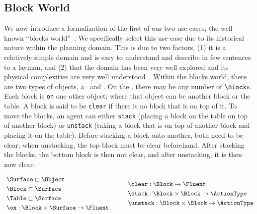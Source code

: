 \subsection{Block World}

We now introduce a formalization of the first of our two use-cases, the
well-known ``blocks world''~\cite{nilsson_principles_1982}. We specifically select
this use-case due to its historical nature within the planning domain.
This is due to two factors, (1) it is a relatively simple domain and is
easy to understand and describe in few sentences to a layman, and
(2) that the domain has been very well explored and its physical
complexities are very well
understood~\cite{gupta_complexity_1992,slaney_blocks_2001}. Within the
blocks world, there are two types of objects, a \Table\ and \Block.
On the \Table, there may be any number of $\Block$s.  Each block is
\texttt{on} one other object; where that object can be another block or the
table. A block is said to be \texttt{clear} if there is no block that
is on top of it. To move the blocks, an agent can either
\texttt{stack} (placing a block on the table on top of another block)
or \texttt{unstack} (taking a block that is on top of another block
and placing it on the table). Before stacking a block onto another, both need
to be clear; when unstacking, the top block must be clear beforehand.
After stacking the blocks, the bottom block is then not clear, and
after unstacking, it is then now clear.

\vspace{-0.03in}
  \begin{equation*}
    \begin{aligned}\
      &\Surface \sqsubset \Object \\
      &\Block \sqsubset \Surface \\
      &\Table \sqsubset \Surface \\
      &\on: \Block \times \Surface \rightarrow \Fluent
             \end{aligned} \hspace{30pt}
 \begin{aligned}
      &\clear: \Block \rightarrow \Fluent \\
      &\stack: \Block \times \Block \rightarrow \ActionType \\
      &\unstack: \Block \times \Block \rightarrow \ActionType
    \end{aligned}
  \end{equation*}
